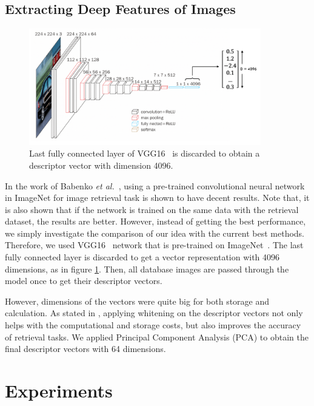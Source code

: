 \subsection{Extracting Deep Features of Images}
\label{extractdeepfeatures}

\begin{figure}
    \centering
    \includegraphics[width=0.9\textwidth]{thesis/images/deep_features-fig.png}
    \caption{Last fully connected layer of VGG16~\cite{simonyan2014very} is discarded to obtain a descriptor vector with dimension 4096.}
    \label{fig:vec-repr}
\end{figure}

In the work of Babenko \emph{et al.}~\cite{babenko2014neural}, using a pre-trained convolutional neural network in ImageNet for image retrieval task is shown to have decent results. 
Note that, it is also shown that if the network is trained on the same data with the retrieval dataset, the results are better.
However, instead of getting the best performance, we simply investigate the comparison of our idea with the current best methods.
Therefore, we used VGG16~\cite{simonyan2014very} network that is pre-trained on ImageNet~\cite{deng2009imagenet}. 
The last fully connected layer is discarded to get a vector representation with 4096 dimensions, as in figure \ref{fig:vec-repr}.
Then, all database images are passed through the model once to get their descriptor vectors.

However, dimensions of the vectors were quite big for both storage and calculation. 
As stated in \cite{jegou2012negative}, applying whitening on the descriptor vectors not only helps with the computational and storage costs, but also improves the accuracy of retrieval tasks.
We applied Principal Component Analysis (PCA) to obtain the final descriptor vectors with 64 dimensions.


\section{Experiments}

